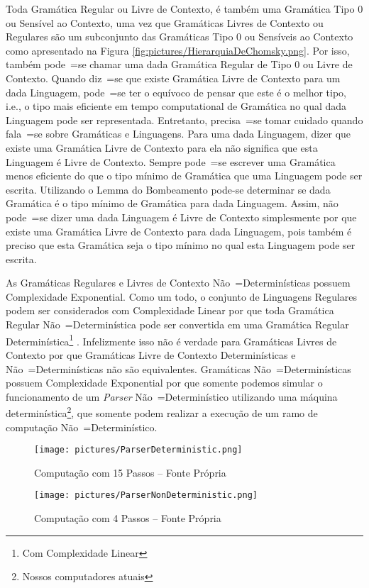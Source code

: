 {    Toda Gramática Regular ou Livre de Contexto,
    é também uma Gramática Tipo 0 ou Sensível ao Contexto,
    uma vez que Gramáticas Livres de Contexto ou Regulares são um
    subconjunto das Gramáticas Tipo 0 ou Sensíveis ao Contexto como
    apresentado na Figura \ref{fig:pictures/HierarquiaDeChomsky.png}.
    Por isso,
    também pode~=se chamar uma dada Gramática Regular de Tipo 0 ou Livre de Contexto.
    Quando diz~=se que existe Gramática Livre de Contexto para um dada Linguagem,
    pode~=se ter o equívoco de pensar que este é o melhor tipo,
    i.e.,
    o tipo mais eficiente em tempo computational de Gramática
    no qual dada Linguagem pode ser representada.
    Entretanto,
    precisa~=se tomar cuidado quando fala~=se sobre Gramáticas e
    Linguagens.
    Para uma dada Linguagem,
    dizer que existe uma Gramática Livre de Contexto para ela
    não significa que esta Linguagem é Livre de Contexto.
    Sempre pode~=se escrever uma Gramática menos eficiente do que o
    tipo mínimo de Gramática que uma Linguagem pode ser escrita.
    Utilizando o Lemma do Bombeamento \cite{hopcroftBook} pode-se determinar
    se dada Gramática é o tipo mínimo de Gramática para dada Linguagem.
    Assim,
    não pode~=se dizer uma dada Linguagem é Livre de Contexto simplesmente
    por que existe uma Gramática Livre de Contexto para dada Linguagem,
    pois também é preciso que esta Gramática seja o tipo
    mínimo no qual esta Linguagem pode ser escrita.

    As Gramáticas Regulares e
    Livres de Contexto Não~=Determinísticas possuem Complexidade Exponential.
    Como um todo,
    o conjunto de Linguagens Regulares podem ser considerados com Complexidade Linear por que
    toda Gramática Regular Não~=Determinística pode ser convertida em uma Gramática
    Regular Determinística\footnote{Com Complexidade Linear} \cite{sipserBook}.
    Infelizmente isso não é verdade para Gramáticas Livres de Contexto
    por que Gramáticas Livre de Contexto Determinísticas e
    Não~=Determinísticas não são equivalentes.
    Gramáticas Não~=Determinísticas possuem Complexidade Exponential por que somente
    podemos simular o funcionamento de um \textit{Parser} Não~=Determinístico
    utilizando uma máquina determinística\footnote{Nossos computadores atuais},
    que somente podem realizar a execução de um ramo de computação Não~=Determinístico.
    \begin{figure}[H]
    \centering
    \texttt{[image: pictures/ParserDeterministic.png]}
    \caption{Computação com 15 Passos -- Fonte Própria}
    \label{fig:pictures/ParserDeterministic.png}
    \end{figure}
    \begin{figure}[H]
    \centering
    \texttt{[image: pictures/ParserNonDeterministic.png]}
    \caption{Computação com 4 Passos -- Fonte Própria}
    \label{fig:pictures/ParserNonDeterministic.png}
    \end{figure}


}

